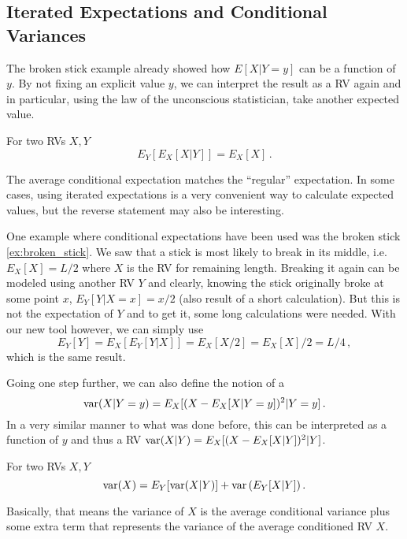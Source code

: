 	\subsection{Iterated Expectations and Conditional Variances}
The broken stick example already showed how $E[X | Y = y]$ can be a function of $y$. By not fixing an explicit value $y$, we can interpret the result as a RV again and in particular, using the law of the unconscious statistician, take another expected value.
\begin{prop}
For two RVs $X, Y$
\begin{equation}
E_Y[E_X[X | Y]] = E_X[X] \,. 
\end{equation}
\end{prop}
The average conditional expectation matches the \enquote{regular} expectation. %
In some cases, using iterated expectations is a very convenient way to calculate expected values, but the reverse statement may also be interesting.


\begin{ex}
One example where conditional expectations have been used was the broken stick \ref{ex:broken_stick}. We saw that a stick is most likely to break in its middle, i.e.~$E_X[X] = L / 2$ where $X$ is the RV for remaining length. Breaking it again can be modeled using another RV $Y$ and clearly, knowing the stick originally broke at some point $x$, $E_Y[Y | X = x] = x / 2$ (also result of a short calculation). But this is not the expectation of $Y$ and to get it, some long calculations were needed. With our new tool however, we can simply use
\begin{equation*}
E_Y[Y] = E_X[E_Y[Y | X]] = E_X[X / 2] = E_X[X] / 2 = L / 4 \, ,
\end{equation*}
which is the same result.
\end{ex}


Going one step further, we can also define the notion of a 
\begin{equation}
\operatorname{var}(X | Y = y) = E_X[(X - E_X[X | Y = y])^2 | Y = y] \, .
\end{equation}
In a very similar manner to what was done before, this can be interpreted as a function of $y$ and thus a RV $\operatorname{var}(X | Y) = E_X[(X - E_X[X | Y])^2 | Y]$.
\begin{prop}
For two RVs $X, Y$
\begin{equation}
\operatorname{var}(X) = E_Y\qty[\operatorname{var}(X | Y)] + \operatorname{var}\qty(E_Y[X | Y]) \, .
\end{equation}
\end{prop}
Basically, that means the variance of $X$ is the average conditional variance plus some extra term that represents the variance of the average conditioned RV $X$.




